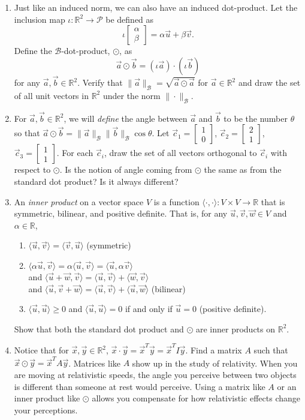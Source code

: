 \documentclass[letter]{article}
\newcommand{\R}{\mathbb{R}}
\newcommand{\mat}[1]{\begin{bmatrix}#1\end{bmatrix}}
\begin{document}
\begin{enumerate}
\begin{enumerate}
				\item Just like an induced norm, we can also have an induced dot-product.  Let the
					inclusion map $\iota:\R^2\to\mathcal P$
					be defined as
					\[
						\iota\mat{\alpha\\\beta} = \alpha \vec u+\beta\vec v.
					\]
					Define the $\mathcal B$-dot-product, $\odot$, as 
					\[
						\vec a\odot \vec b = (\iota \vec a)\cdot (\iota \vec b)
					\]
					for any $\vec a,\vec b\in\R^2$.  Verify that $\|\vec a\|_{\mathcal B} = \sqrt{\vec a\odot\vec a}$
					for $\vec a\in\R^2$ and draw the set of all unit vectors in $\R^2$ under the norm $\|\cdot\|_{\mathcal B}$.
				\item For $\vec a,\vec b\in\R^2$, we will \emph{define} the angle between $\vec a$ and $\vec b$
					to be the number $\theta$ so that $\vec a\odot\vec b=\|\vec a\|_{\mathcal B}\|\vec b\|_{\mathcal B}\cos\theta$.
					Let $\vec c_1=\mat{1\\0}$, $\vec c_2=\mat{2\\1}$, $\vec c_3=\mat{1\\1}$.  For each $\vec c_i$, draw
					the set of all vectors orthogonal to $\vec c_i$ with respect to $\odot$.  Is the notion of
					angle coming from $\odot$ the same as from the standard dot product?  Is it always different?


				\item  An \emph{inner product} on a vector space $V$ is a function $\langle \cdot,\cdot\rangle:V\times V\to\R$
					that is symmetric, bilinear, and positive definite.  That is, for any $\vec u,\vec v,\vec w\in V$
					and $\alpha\in\R$,
					\begin{enumerate}
						\item $\langle \vec u,\vec v\rangle =\langle \vec v,\vec u\rangle$ (symmetric)
						\item $\langle \alpha\vec u,\vec v\rangle =\alpha\langle \vec u,\vec v\rangle =\langle \vec u,\alpha\vec v\rangle$\\
							and $\langle \vec u+\vec w,\vec v\rangle =\langle \vec u,\vec v\rangle+\langle \vec w,\vec v\rangle$\\
							and $\langle \vec u,\vec v+\vec w\rangle =\langle \vec u,\vec v\rangle+\langle \vec u,\vec w\rangle$ (bilinear)
						\item $\langle \vec u,\vec u\rangle\geq 0$ and $\langle \vec u,\vec u\rangle=0$ if and only if $\vec u=0$ (positive definite).
					\end{enumerate}

					Show that both the standard dot product and $\odot$ are inner products on $\R^2$.
				\item Notice that for $\vec x,\vec y\in\R^2$, $\vec x\cdot\vec y = \vec x^T\vec y=\vec x^TI\vec y$.
					Find a matrix $A$ such that $\vec x\odot \vec y=\vec x^TA\vec y$.  Matrices like $A$ 
					show up in the study of relativity.  When you are moving at relativistic speeds, the angle
					you perceive between two objects is different than someone at rest would perceive.  Using
					a matrix like $A$ or an inner product like $\odot$ allows you compensate for how relativistic
					effects change your perceptions.
			\end{enumerate}

	\end{enumerate}
\end{document}
